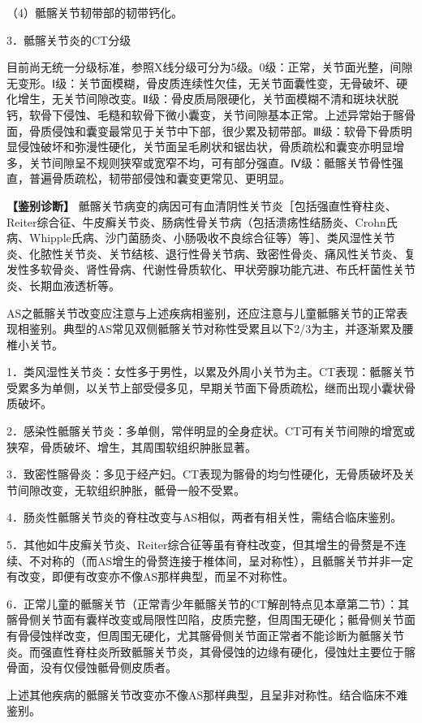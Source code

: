 （4）骶髂关节韧带部的韧带钙化。

3．骶髂关节炎的CT分级

目前尚无统一分级标准，参照X线分级可分为5级。0级：正常，关节面光整，间隙无变形。Ⅰ级：关节面模糊，骨皮质连续性欠佳，无关节面囊性变，无骨破坏、硬化增生，无关节间隙改变。Ⅱ级：骨皮质局限硬化，关节面模糊不清和斑块状脱钙，软骨下侵蚀、毛糙和软骨下微小囊变，关节间隙基本正常。上述异常始于髂骨面，骨质侵蚀和囊变最常见于关节中下部，很少累及韧带部。Ⅲ级：软骨下骨质明显侵蚀破坏和弥漫性硬化，关节面呈毛刷状和锯齿状，骨质疏松和囊变亦明显增多，关节间隙呈不规则狭窄或宽窄不均，可有部分强直。Ⅳ级：骶髂关节骨性强直，普遍骨质疏松，韧带部侵蚀和囊变更常见、更明显。

\textbf{【鉴别诊断】}
骶髂关节病变的病因可有血清阴性关节炎［包括强直性脊柱炎、Reiter综合征、牛皮癣关节炎、肠病性骨关节病（包括溃疡性结肠炎、Crohn氏病、Whipple氏病、沙门菌肠炎、小肠吸收不良综合征等）等］、类风湿性关节炎、化脓性关节炎、关节结核、退行性骨关节病、致密性骨炎、痛风性关节炎、复发性多软骨炎、肾性骨病、代谢性骨质软化、甲状旁腺功能亢进、布氏杆菌性关节炎、长期血液透析等。

AS之骶髂关节改变应注意与上述疾病相鉴别，还应注意与儿童骶髂关节的正常表现相鉴别。典型的AS常见双侧骶髂关节对称性受累且以下2/3为主，并逐渐累及腰椎小关节。

1．类风湿性关节炎：女性多于男性，以累及外周小关节为主。CT表现：骶髂关节受累多为单侧，以关节上部受侵多见，早期关节面下骨质疏松，继而出现小囊状骨质破坏。

2．感染性骶髂关节炎：多单侧，常伴明显的全身症状。CT可有关节间隙的增宽或狭窄，骨质破坏、增生，其周围软组织肿胀显著。

3．致密性髂骨炎：多见于经产妇。CT表现为髂骨的均匀性硬化，无骨质破坏及关节间隙改变，无软组织肿胀，骶骨一般不受累。

4．肠炎性骶髂关节炎的脊柱改变与AS相似，两者有相关性，需结合临床鉴别。

5．其他如牛皮癣关节炎、Reiter综合征等虽有脊柱改变，但其增生的骨赘是不连续、不对称的（而AS增生的骨赘连接于椎体间，呈对称性），且骶髂关节并非一定有改变，即便有改变亦不像AS那样典型，而呈不对称性。

6．正常儿童的骶髂关节（正常青少年骶髂关节的CT解剖特点见本章第二节）：其髂骨侧关节面有囊样改变或局限性凹陷，皮质完整，但周围无硬化；骶骨侧关节面有骨侵蚀样改变，但周围无硬化，尤其髂骨侧关节面正常者不能诊断为骶髂关节炎。而强直性脊柱炎所致骶髂关节炎，其骨侵蚀的边缘有硬化，侵蚀灶主要位于髂骨面，没有仅侵蚀骶骨侧皮质者。

上述其他疾病的骶髂关节改变亦不像AS那样典型，且呈非对称性。结合临床不难鉴别。


